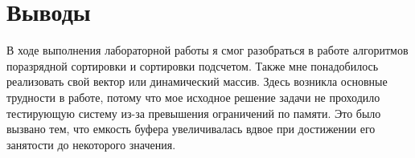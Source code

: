 \section{Выводы}
В ходе выполнения лабораторной работы я смог разобраться в работе алгоритмов поразрядной сортировки и сортировки подсчетом. Также мне понадобилось реализовать свой вектор или динамический массив. Здесь возникла основные трудности в работе, потому что мое исходное решение задачи не проходило тестирующую систему из-за превышения ограничений по памяти. Это было вызвано тем, что емкость буфера увеличивалась вдвое при достижении его занятости до некоторого значения.
\pagebreak